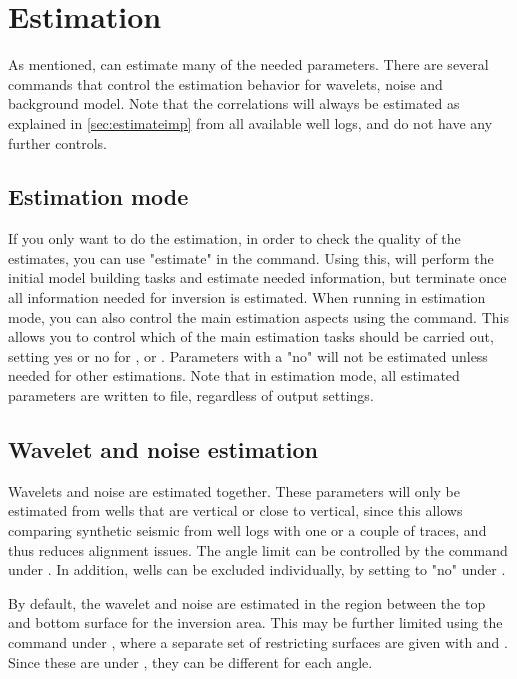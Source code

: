 \section{Estimation}
\label{sec:estimateusr}
As mentioned, \crava can estimate many of the needed parameters. There
are several commands that control the estimation behavior for
wavelets, noise and background model. Note that the correlations will
always be estimated as explained in \autoref{sec:estimateimp} from all
available well logs, and do not have any further controls. 

\subsection{Estimation mode}
If you only want to do the estimation, in order to check the quality
of the estimates, you can use "estimate" in the 
command. Using this, \crava will perform the initial model building
tasks and estimate needed information, but terminate once all
information needed for inversion is estimated. When running in
estimation mode, you can also control the main estimation aspects
using the 
command. This allows you to control which of the main estimation tasks
should be carried out, setting yes or no for
,  or
. Parameters with a "no" will not be estimated
unless needed for other estimations. Note that in estimation mode, all
estimated parameters are written to file, regardless of output
settings. 
\subsection{Wavelet and noise estimation}
Wavelets and noise are estimated together. These parameters will only
be estimated from wells that are vertical or close to vertical, since
this allows comparing synthetic seismic from well logs with one or a
couple of traces, and thus reduces alignment issues. The angle limit
can be controlled by the
 command
under . In addition, wells can be excluded individually,
by setting  to "no" under . 

By default, the wavelet and noise are estimated in the region between
the top and bottom surface for the inversion area. This may be further
limited using the  command under
, where a separate set of restricting surfaces are given
with  and . Since these are
under , they can be different for each angle. 

